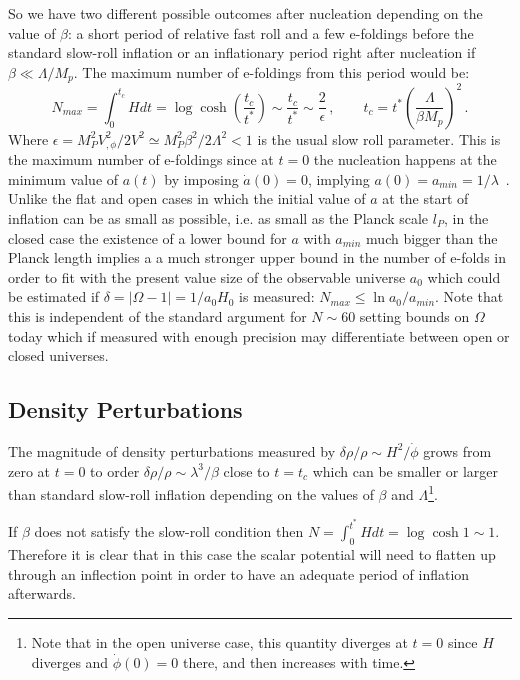 \documentclass[a4paper,11pt]{article}
\numberwithin{equation}{section}
\begin{document}
\begin{itemize}
So we have two different possible outcomes after nucleation depending on the value of $\beta$: a short period of relative fast roll and a few e-foldings before the standard slow-roll inflation or an inflationary period right after nucleation if $\beta\ll\Lambda/M_p $. The maximum number of e-foldings from this period would be:
\begin{equation}
N_{max}= \int_0^{t_c} H dt=\log \cosh\left(\frac{t_c}{t^*}\right)\sim \frac{t_c}{t^*}\sim\frac{2}{\epsilon} \,,\qquad t_c=t^*\left(\frac{\Lambda}{\beta M_p}\right)^2 \,.
\end{equation}
Where $\epsilon=M_P^2V_{,\phi}^2/2V^2\simeq M_P^2\beta^2/2\Lambda^2< 1$ is the usual slow roll parameter. This is the maximum number of e-foldings since  at $t=0$ the nucleation happens at the minimum value of $a(t)$ by imposing $\dot a(0)=0$, implying $a(0)=a_{min}=1/\lambda$~\cite{Ellis:2001ym}. Unlike the flat and open cases in which the initial value of $a$ at the start of inflation can be as small as possible, i.e. as small as the Planck scale $l_P$, in the closed case the existence of  a lower bound for $a$ with $a_{min}$ much bigger than the Planck length implies a a much stronger upper bound in the number of e-folds in order to fit with the present value  size of the observable universe $a_0$ which could be estimated if $\delta=|\Omega -1|=1/a_0H_0 $ is measured: $N_{max}\leq \ln{a_0/a_{min}}$. Note that this is independent of the standard argument for $N\sim 60$ setting bounds on $\Omega$ today which if measured with enough precision  may differentiate between open or closed universes.
 
 
 \subsection*{Density Perturbations}
 
The magnitude of density perturbations measured by  $\delta\rho/\rho\sim H^2/\dot\phi $ grows from zero at $t=0$ to order $\delta\rho/\rho\sim \lambda^3/\beta $ close to $t=t_c$ which can be smaller or larger than standard slow-roll inflation depending on the values of $\beta$ and  $\Lambda$\footnote{Note that in the open universe case,  this quantity diverges at $t=0$ since $H$ diverges and $\dot\phi(0)=0$ there, and then increases with time.}. 

If $\beta$ does not satisfy the slow-roll condition then $N=\int_0^{t^*} H dt=\log \cosh 1\sim 1$. Therefore it is clear that in this case the scalar potential will need to flatten up through an inflection point in order to have an adequate period of inflation afterwards.


\end{itemize}
\end{document}
